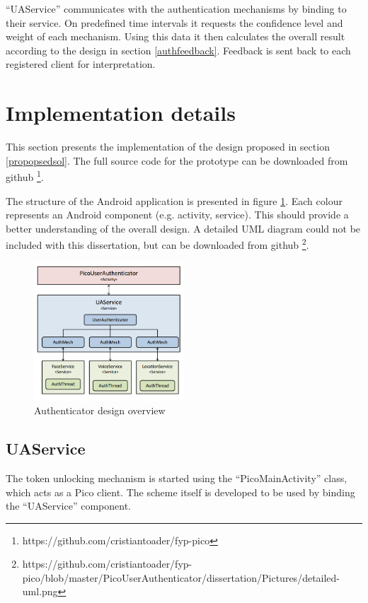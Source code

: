 ``UAService'' communicates with the authentication mechanisms by binding to their service. On predefined time intervals it requests the confidence level and weight of each mechanism. Using this data it then calculates the overall result according to the design in section \ref{authfeedback}. Feedback is sent back to each registered client for interpretation.

\section{Implementation details}
This section presents the implementation of the design proposed in section \ref{propopsedsol}. The full source code for the prototype can be downloaded from github \footnote{https://github.com/cristiantoader/fyp-pico}. 

The structure of the Android application is presented in figure \ref{fig:overview}. Each colour represents an Android component (e.g. activity, service). This should provide a better understanding of the overall design. A detailed UML diagram could not be included with this dissertation, but can be downloaded from github \footnote{https://github.com/cristiantoader/fyp-pico/blob/master/PicoUserAuthenticator/dissertation/Pictures/detailed-uml.png}.
\begin{figure}[h]
    \centering
    \includegraphics[width=0.5\textwidth]{Pictures/overview-uml}
    \caption{Authenticator design overview}
    \label{fig:overview}
\end{figure}

\subsection{UAService}
The token unlocking mechanism is started using the ``PicoMainActivity'' class, which acts as a Pico client. The scheme itself is developed to be used by binding the ``UAService'' component.

